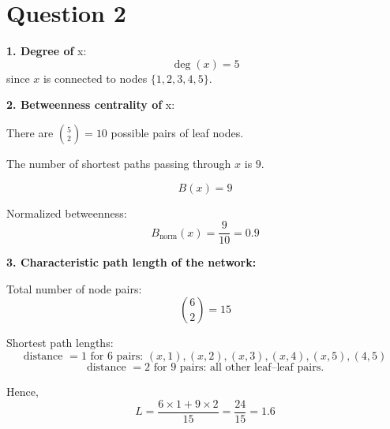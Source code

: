 \section*{Question 2}

\textbf{1. Degree of } x:
\[
    \deg(x) = 5
\]
since $x$ is connected to nodes $\{1,2,3,4,5\}$.

\textbf{2. Betweenness centrality of } x:

There are $\binom{5}{2} = 10$ possible pairs of leaf nodes.

The number of shortest paths passing through $x$ is $9$.

\[
    B(x) = 9
\]

Normalized betweenness:
\[
    B_{\text{norm}}(x) = \frac{9}{10} = 0.9
\]

\textbf{3. Characteristic path length of the network:}

Total number of node pairs:
\[
    \binom{6}{2} = 15
\]

Shortest path lengths:
\[
    \text{distance } = 1 \text{ for 6 pairs: } (x,1),(x,2),(x,3),(x,4),(x,5),(4,5)
\]
\[
    \text{distance } = 2 \text{ for 9 pairs: all other leaf–leaf pairs.}
\]

Hence,
\[
    L = \frac{6 \times 1 + 9 \times 2}{15} = \frac{24}{15} = 1.6
\]

